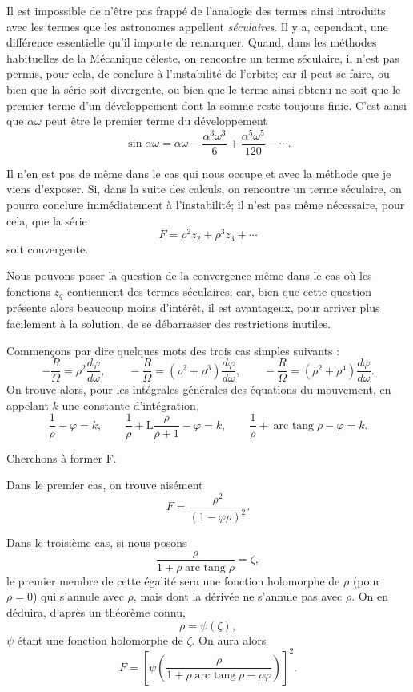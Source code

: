 \documentclass[11pt]{article}
\begin{document}
Il est impossible de n’être pas frappé de l’analogie des termes ainsi introduits avec les termes que les astronomes appellent \emph{séculaires}. Il y a, cependant, une différence essentielle qu’il importe de remarquer. Quand, dans les méthodes habituelles de la Mécanique céleste, on rencontre un terme séculaire, il n’est pas permis, pour cela, de conclure à l’instabilité de l’orbite; car il peut se faire, ou bien que la série soit divergente, ou bien que le terme ainsi obtenu ne soit que le premier terme d’un développement dont la somme reste toujours finie. C’est ainsi que $\alpha\omega$ peut être le premier terme du développement
\[
\sin\alpha\omega=\alpha\omega-\frac{\alpha^3\omega^3}{6}+\frac{\alpha^5\omega^5}{120}-\cdots.
\]

Il n’en est pas de même dans le cas qui nous occupe et avec la méthode que je viens d’exposer. Si, dans la suite des calculs, on rencontre un terme séculaire, on pourra conclure immédiatement à l’instabilité; il n’est pas même nécessaire, pour cela, que la série
\[
F=\rho^2z_2+\rho^3z_3+\cdots
\]
soit convergente.

Nous pouvons poser la question de la convergence même dans le cas où les fonctions $z_q$ contiennent des termes séculaires; car, bien que cette question présente alors beaucoup moins d’intérêt, il est avantageux, pour arriver plus facilement à la solution, de se débarrasser des restrictions inutiles.

Commençons par dire quelques mots des trois cas simples suivants :
\[
-\frac{R}{\Omega}=\rho^2\frac{d\varphi}{d\omega},
\qquad
-\frac{R}{\Omega}=(\rho^2+\rho^3)\frac{d\varphi}{d\omega},
\qquad
-\frac{R}{\Omega}=(\rho^2+\rho^4)\frac{d\varphi}{d\omega}.
\]
On trouve alors, pour les intégrales générales des équations du mouvement, en appelant $k$ une constante d’intégration,
\[
\frac1\rho-\varphi=k,
\qquad
\frac1\rho+\mathrm L\frac{\rho}{\rho+1}-\varphi=k,
\qquad
\frac1\rho+\operatorname{arc\ tang}\rho-\varphi=k.
\]

Cherchons à former F.

Dans le premier cas, on trouve aisément
\[
F=\frac{\rho^2}{(1-\varphi\rho)^2}.
\]

Dans le troisième cas, si nous posons
\[
\frac{\rho}{1+\rho\operatorname{arc\ tang}\rho}=\zeta,
\]
le premier membre de cette égalité sera une fonction holomorphe de $\rho$ (pour $\rho=0$) qui s’annule avec $\rho$, mais dont la dérivée ne s’annule pas avec $\rho$. On en déduira, d’après un théorème connu,
\[
\rho=\psi(\zeta),
\]
$\psi$ étant une fonction holomorphe de $\zeta$. On aura alors
\[
F=\left[\psi\left(\frac{\rho}{1+\rho\operatorname{arc\ tang}\rho-\rho\varphi}\right)\right]^2.
\]
\end{document}
